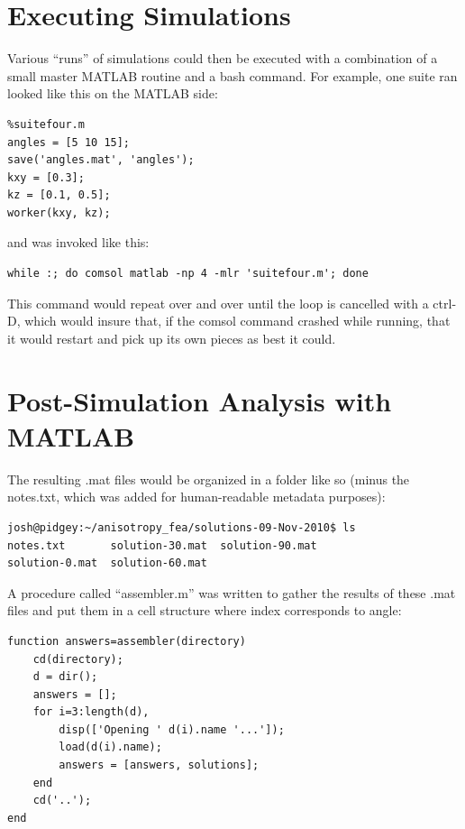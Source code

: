 \section{Executing Simulations}

Various ``runs'' of simulations could then be executed with a combination of a
small master MATLAB routine and a bash command. For example, one suite ran
looked like this on the MATLAB side:

\small
\begin{verbatim}
%suitefour.m
angles = [5 10 15];
save('angles.mat', 'angles');
kxy = [0.3];
kz = [0.1, 0.5];
worker(kxy, kz);
\end{verbatim}
\normalsize 

and was invoked like this:

\small
\begin{verbatim}
while :; do comsol matlab -np 4 -mlr 'suitefour.m'; done
\end{verbatim}
\normalsize

This command would repeat over and over until the loop is cancelled with a
ctrl-D, which would insure that, if the comsol command crashed while running,
that it would restart and pick up its own pieces as best it could.

\section{Post-Simulation Analysis with MATLAB}

The resulting .mat files would be organized in a folder like so (minus the
notes.txt, which was added for human-readable metadata purposes):

\small
\begin{verbatim}
josh@pidgey:~/anisotropy_fea/solutions-09-Nov-2010$ ls
notes.txt       solution-30.mat  solution-90.mat
solution-0.mat  solution-60.mat

\end{verbatim}
\normalsize

A procedure called ``assembler.m'' was written to gather the results of these
.mat files and put them in a cell structure where index corresponds to
angle:

\small
\begin{verbatim}
function answers=assembler(directory)
    cd(directory);
    d = dir();
    answers = [];
    for i=3:length(d),
        disp(['Opening ' d(i).name '...']);
        load(d(i).name);
        answers = [answers, solutions];
    end
    cd('..');
end
\end{verbatim}
\normalsize

